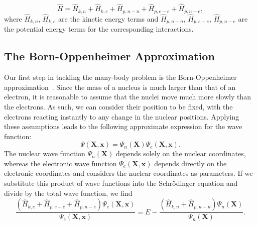 \begin{refsection}
\begin{equation}
\hat{H} = \hat{H}_{k,n} + \hat{H}_{k,e} + \hat{H}_{p,n-n} + \hat{H}_{p,e-e} + \hat{H}_{p,n-e},
\end{equation}
where $\hat{H}_{k,n}$, $\hat{H}_{k,e}$ are the kinetic energy terms and $\hat{H}_{p,n-n}$, $\hat{H}_{p,e-e}$, $\hat{H}_{p,n-e}$ are the potential energy terms for the corresponding interactions.

\subsection{The Born-Oppenheimer Approximation}

Our first step in tackling the many-body problem is the Born-Oppenheimer approximation~\cite{Born1927}. Since the mass of a nucleus is much larger than that of an electron, it is reasonable to assume that the nuclei move much more slowly than the electrons. As such, we can consider their position to be fixed, with the electrons reacting instantly to any change in the nuclear positions. Applying these assumptions leads to the following approximate expression for the wave function:
\begin{equation}
\Psi (\mathbf{X}, \mathbf{x}) = \Psi_n (\mathbf{X}) \Psi_e (\mathbf{X}, \mathbf{x}).
\end{equation}
The nuclear wave function $ \Psi_n (\mathbf{X})$ depends solely on the nuclear coordinates, whereas the electronic wave function $\Psi_e (\mathbf{X},\mathbf{x})$ depends directly on the electronic coordinates and considers the nuclear coordinates as parameters. If we substitute this product of wave functions into the Schr\"odinger equation and divide by the total wave function, we find
\begin{equation}
\frac{(\hat{H}_{k,e} + \hat{H}_{p,e-e} + \hat{H}_{p,n-e})\Psi_e(\mathbf{X}, \mathbf{x})}{\Psi_e(\mathbf{X}, \mathbf{x})} = E - \frac{(\hat{H}_{k,n} + \hat{H}_{p,n-n})\Psi_n (\mathbf{X})}{\Psi_n (\mathbf{X}) }.
\end{equation}


\end{refsection}
